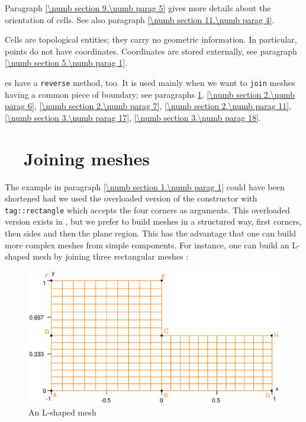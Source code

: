 Paragraph \ref{\numb section 9.\numb parag 5} gives more details about the orientation of cells.
See also paragraph \ref{\numb section 11.\numb parag 4}.

Cells are topological entities; they carry no geometric information.
In particular, points do not have coordinates.
Coordinates are stored externally, see paragraph \ref{\numb section 5.\numb parag 1}.

{\small\tt {}}es have a {\small\tt reverse} method, too.
It is used mainly when we want to {\small\tt join} meshes having a common piece of boundary;
see paragraphs \ref{\numb section 1.\numb parag 3}, \ref{\numb section 2.\numb parag 6},
\ref{\numb section 2.\numb parag 7}, \ref{\numb section 2.\numb parag 11},
\ref{\numb section 3.\numb parag 17}, \ref{\numb section 3.\numb parag 18}.


\section{~~Joining meshes}\label{\numb section 1.\numb parag 3}

The example in paragraph \ref{\numb section 1.\numb parag 1} could have been shortened
had we used the overloaded version of the {\small\tt {}} constructor with
{\small\tt \textcolor{tag}{tag}::rectangle} which accepts the four corners as arguments. 
This overloaded version exists in \maniFEM, but we prefer to build meshes in a structured way, 
first corners, then sides and then the plane region. 
This has the advantage that one can build more complex meshes from simple components. 
For instance, one can build an L-shaped mesh by joining three rectangular meshes :

\begin{figure}[ht] \centering
  \includegraphics[width=115mm]{L-shaped}
  \caption{An L-shaped mesh}
  \label{\numb section 1.\numb fig 5}
\end{figure}

